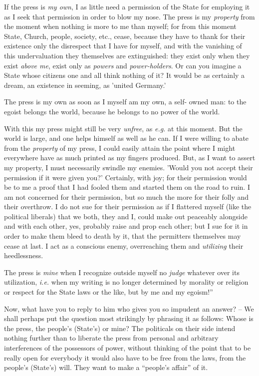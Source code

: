 \documentclass[12pt,a4paper]{book}
\begin{document}
If the press is \textit{my own}, I as little need a permission of the State 
for employing it as I seek that permission in order to blow my nose. The press 
is my \textit{property} from the moment when nothing is more to me than 
myself; for from this moment State, Church, people, society, etc., cease, 
because they have to thank for their existence only the disrespect that I have 
for myself, and with the vanishing of this undervaluation they themselves are 
extinguished: they exist only when they exist \textit{above me}, exist only as 
\textit{powers} and \textit{power-holders}. Or can you imagine a State whose 
citizens one and all think nothing of it? It would be as certainly a dream, an 
existence in seeming, as 'united Germany.'

The press is my own as soon as I myself am my own, a self- owned man: to the 
egoist belongs the world, because he belongs to no power of the world.

With this my press might still be very \textit{unfree}, as \textit{e.g.} at 
this moment. But the world is large, and one helps himself as well as he can. 
If I were willing to abate from the \textit{property} of my press, I could 
easily attain the point where I might everywhere have as much printed as my 
fingers produced. But, as I want to assert my property, I must necessarily 
swindle my enemies. 'Would you not accept their permission if it were given 
you?' Certainly, with joy; for their permission would be to me a proof that I 
had fooled them and started them on the road to ruin. I am not concerned for 
their permission, but so much the more for their folly and their overthrow. I 
do not sue for their permission as if I flattered myself (like the political 
liberals) that we both, they and I, could make out peaceably alongside and 
with each other, yes, probably raise and prop each other; but I sue for it in 
order to make them bleed to death by it, that the permitters themselves may 
cease at last. I act as a conscious enemy, overreaching them and 
\textit{utilizing} their heedlessness.

The press is \textit{mine} when I recognize outside myself no \textit{judge} 
whatever over its utilization, \textit{i.e.} when my writing is no longer 
determined by morality or religion or respect for the State laws or the like, 
but by me and my egoism!''

Now, what have you to reply to him who gives you so impudent an answer? -- We 
shall perhaps put the question most strikingly by phrasing it as follows: 
Whose is the press, the people's (State's) or mine? The politicals on their 
side intend nothing further than to liberate the press from personal and 
arbitrary interferences of the possessors of power, without thinking of the 
point that to be really open for everybody it would also have to be free from 
the laws, from the people's (State's) will. They want to make a ``people's 
affair'' of it.
\end{document}
